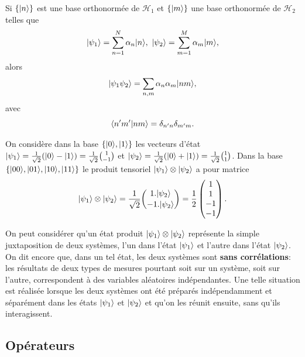 Si $\{\vert n\rangle\}$ est une base orthonormée de $\mathcal{H}_{1}$ et $\{\vert m\rangle\}$
une base orthonormée de $\mathcal{H}_{2}$ telles que%
\begin{equation}
\vert\psi_{1}\rangle=\sum_{n=1}^{N}\alpha_{n}\vert n\rangle,\ \vert\psi_{2}\rangle=\sum_{m=1}^{M}
\alpha_{m}\vert m\rangle,
\end{equation}
alors%
\begin{equation}
\ket{\psi_{1}\psi_{2}}=\sum_{n,m}\alpha_{n}\alpha_{m}\ket{nm},
\label{eq:PT2}%
\end{equation}
avec%
\begin{equation}
\langle n^{\prime}m^{\prime}\vert nm\rangle=\delta_{n^{\prime}n}\delta_{m^{\prime}m}.
\end{equation}

\begin{example}
On considère dans la base $\{\vert0\rangle,\vert1\rangle\}$ les vecteurs d'état
$\vert\psi_1\rangle=\frac{1}{\sqrt{2}}(\vert0\rangle-\vert1\rangle)=
\frac{1}{\sqrt{2}}\binom{1}{-1}$ et
$\vert\psi_{2}\rangle=\frac{1}{\sqrt{2}}(\vert0\rangle+\vert1\rangle)=\frac{1}{\sqrt{2}}
\binom{1}{1}$. Dans la base $\{\vert00\rangle,\vert01\rangle,\vert10\rangle,\vert11\rangle\}$ le produit
tensoriel $\vert\psi_{1}\rangle\otimes\vert\psi_{2}\rangle$ a pour matrice%
\begin{equation}
\vert\psi_{1}\rangle\otimes\vert\psi_{2}\rangle=\frac{1}{\sqrt{2}}\binom{1.\vert\psi_{2}\rangle}{
-1.\vert\psi_{2}\rangle}=\frac{1}{2}\begin{pmatrix}
1\\
1\\
-1\\
-1
\end{pmatrix}.
\end{equation}

\end{example}

On peut considérer qu'un état produit $\vert\psi_{1}\rangle \otimes\vert\psi_{2}\rangle$
représente la simple juxtaposition de deux systèmes, l'un dans l'état
$\vert\psi_{1}\rangle$ et l'autre dans l'état $\vert\psi_{2}\rangle$. On dit encore que,
dans un tel état, les deux systèmes sont \textbf{sans corrélations}: les
résultats de deux types de mesures pourtant soit sur un système, soit sur
l'autre, correspondent à des variables aléatoires indépendantes. Une telle
situation est réalisée lorsque les deux systèmes ont été préparés indépendamment
et séparément dans les états $\vert\psi_{1}\rangle$ et $\vert\psi_{2}\rangle$ et qu'on les
réunit ensuite, sans qu'ils interagissent.

\subsection{Opérateurs}

